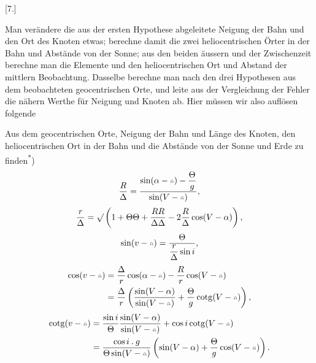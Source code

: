 \begin{center}
[7.]\par\medskip
{}
\end{center}
\noindent\hspace*{\parindent}Man verändere die aus der ersten Hypothese abgeleitete Neigung der Bahn und den Ort des Knoten etwas; berechne damit die zwei heliocentrischen Örter in der Bahn und Abstände von der Sonne; aus den beiden äussern und der Zwischenzeit berechne man die Elemente und den heliocentrischen Ort und Abstand der mittlern Beobachtung. Dasselbe berechne man nach den drei Hypothesen aus dem beobachteten geocentrischen Orte, und leite aus der Vergleichung der Fehler die nähern Werthe für Neigung und Knoten ab. Hier müssen wir also auflösen folgende
\clearpage
{}
\begin{center}\end{center}
\noindent\hspace*{\parindent}Aus dem geocentrischen Orte, Neigung der Bahn und Länge des Knoten, den heliocentrischen Ort in der Bahn und die Abstände von der Sonne und Erde zu finden\textsuperscript{*})
\begingroup\renewcommand{\thefootnote}{}\endgroup
\[
\frac R\Delta=\frac{\sin(\alpha-\AstNode)-\dfrac\Theta g}{\sin(V-\AstNode)},
\]
\[
\frac r\Delta=\surd\left(1+\Theta\Theta+\frac{RR}{\Delta\Delta}-2\frac R\Delta\cos(V-\alpha)\right),
\]
\[
\sin(v-\AstNode)=\frac\Theta{\dfrac r\Delta\sin i},
\]
\[
\begin{aligned}
\cos(v-\AstNode)&=\frac\Delta r\cos(\alpha-\AstNode)-\frac Rr\cos(V-\AstNode)\\
&=\frac\Delta r\left(\frac{\sin(V-\alpha)}{\sin(V-\AstNode)}+\frac\Theta g\operatorname{cotg}(V-\AstNode)\right),
\end{aligned}
\]
\[
\begin{aligned}
\operatorname{cotg}(v-\AstNode)&=\frac{\sin i}\Theta\frac{\sin(V-\alpha)}{\sin(V-\AstNode)}+\cos i\operatorname{cotg}(V-\AstNode)\\
&=\frac{\cos i\mathbin{.}g}{\Theta\sin(V-\AstNode)}\left(\sin(V-\alpha)+\frac\Theta g\cos(V-\AstNode)\right).
\end{aligned}
\]
\clearpage\endgroup
